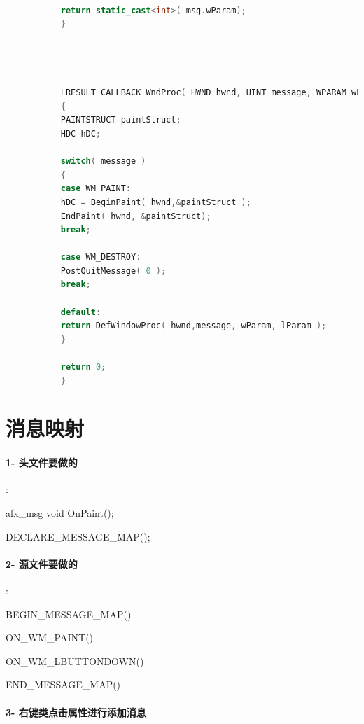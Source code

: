 \documentclass[UTF8,a4paper,8pt]{ctexart}
\begin{document}
\begin{lstlisting}[language=C++]
	       
	       return static_cast<int>( msg.wParam);  
	       }  
	       
	       
	       
	       
	       LRESULT CALLBACK WndProc( HWND hwnd, UINT message, WPARAM wParam, LPARAM lParam )  
	       {  
	       PAINTSTRUCT paintStruct;  
	       HDC hDC;  
	       
	       switch( message )  
	       {  
	       case WM_PAINT:  
	       hDC = BeginPaint( hwnd,&paintStruct );  
	       EndPaint( hwnd, &paintStruct);  
	       break;  
	       
	       case WM_DESTROY:  
	       PostQuitMessage( 0 );  
	       break;  
	       
	       default:  
	       return DefWindowProc( hwnd,message, wParam, lParam );  
	       }  
	       
	       return 0;  
	       }  
	    \end{lstlisting}
	 
 \section{消息映射}
  
	  \paragraph{1- 头文件要做的}:
	      
	      afx\_msg void OnPaint();     %
	      
	      DECLARE\_MESSAGE\_MAP();
	      
	  \paragraph{2- 源文件要做的}:
	  
	      BEGIN\_MESSAGE\_MAP()
	       
	       ON\_WM\_PAINT()          %
	       
	       ON\_WM\_LBUTTONDOWN()    %
	      
	      END\_MESSAGE\_MAP()
	      
	  \paragraph{3- 右键类点击属性进行添加消息}
 
\end{document}

